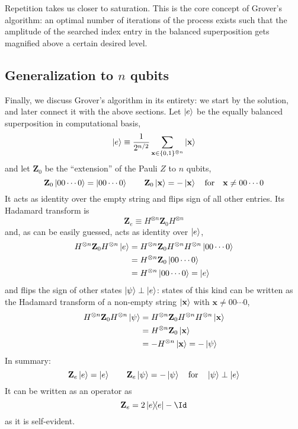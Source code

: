 Repetition takes us closer to saturation. This is the core concept of Grover's algorithm: an optimal number of iterations of the process exists such that the amplitude of the searched index entry in the balanced superposition gets magnified above a certain desired level.

\subsection{Generalization to $n$ qubits}

Finally, we discuss Grover's algorithm in its entirety: we start by the solution, and later connect it with the above sections. Let $\ket{e}$ be the equally balanced superposition in computational basis,
\[
	\ket{e} \equiv \frac{1}{2^{n/2}} \sum_{\mathbf{x} \in \lbrace 0,1 \rbrace^{\otimes n}} \ket{\mathbf{x}}
\]
and let $\mathbf{Z}_0$ be the ``extension'' of the Pauli $Z$ to $n$ qubits,
\[
	\mathbf{Z}_0 \ket{00\cdots0} = \ket{00\cdots0}
	\qquad
	\mathbf{Z}_0 \ket{\mathbf{x}} = -\ket{\mathbf{x}} \qq{for} \mathbf{x} \neq 00\cdots0
\]
It acts as identity over the empty string and flips sign of all other entries. Its Hadamard transform is
\[
	\mathbf{Z}_e \equiv H^{\otimes n} \mathbf{Z}_0 H^{\otimes n}
\]
and, as can be easily guessed, acts as identity over $\ket{e}$,
\[
\begin{aligned}
	H^{\otimes n} \mathbf{Z}_0 H^{\otimes n} \ket{e} &= H^{\otimes n} \mathbf{Z}_0 H^{\otimes n} H^{\otimes n} \ket{00\cdots0} \\
	&= H^{\otimes n} \mathbf{Z}_0 \ket{00\cdots0} \\ 
	&= H^{\otimes n} \ket{00\cdots0} = \ket{e}
\end{aligned}
\]
and flips the sign of other states $\ket{\psi} \perp \ket{e}$: states of this kind can be written as the Hadamard transform of a non-empty string $\ket{\mathbf{x}}$ with $\mathbf{x} \neq 00\cdots0$,
\[
\begin{aligned}
	H^{\otimes n} \mathbf{Z}_0 H^{\otimes n} \ket{\psi} &= H^{\otimes n} \mathbf{Z}_0 H^{\otimes n} H^{\otimes n} \ket{\mathbf{x}} \\
	&= H^{\otimes n} \mathbf{Z}_0 \ket{\mathbf{x}} \\ 
	&= - H^{\otimes n} \ket{\mathbf{x}} = - \ket{\psi}
\end{aligned}
\]
In summary:
\[
	\mathbf{Z}_e \ket{e} = \ket{e}
	\qquad
	\mathbf{Z}_e \ket{\psi} = -\ket{\psi} \qq{for} \ket{\psi} \perp \ket{e}
\]
It can be written as an operator as
\[
	\mathbf{Z}_e = 2 \op{e} - \Id
\]
as it is self-evident.

